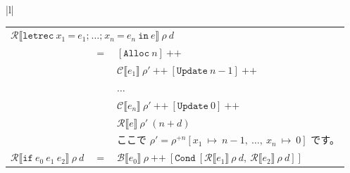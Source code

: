 \documentclass{jbook}
\begin{document}
\begin{tabular} {|l|}
\begin{tabular}{r c l}
		\multicolumn{3}{l}{$\mathcal{R} \llbracket \texttt{letrec} ~ x_1 ~ \texttt{=} ~ e_1\texttt{;} ~  \ldots \texttt{;} ~ x_n ~ \texttt{=} ~ e_n ~ \texttt{in} ~ e \rrbracket ~ \rho ~ d$}                                                                                                                        \\
		                                                                                      & $=$ & $\left[\texttt{Alloc} ~ n\right] ~ \texttt{++}$                                                                                                                                                                \\
		                                                                                      &     & $\mathcal{C} \llbracket e_1 \rrbracket ~ \rho' ~ \texttt{++} ~ \left[\texttt{Update} ~ n - 1\right] ~ \texttt{++}$                                                                                             \\
		                                                                                      &     & $\ldots$                                                                                                                                                                                                       \\
		                                                                                      &     & $\mathcal{C} \llbracket e_n \rrbracket ~ \rho' ~ \texttt{++} ~ \left[\texttt{Update} ~ 0\right] ~ \texttt{++}$                                                                                                 \\
		                                                                                      &     & $\mathcal{R} \llbracket e \rrbracket ~ \rho' ~ (n + d)$                                                                                                                                                        \\
		                                                                                      &     & ここで $\rho' = \rho^{+n} \left[x_1 ~ \mapsto ~ n - 1, ~ \ldots , ~ x_n ~ \mapsto ~ 0\right]$ です。                                                                                                           \\
		$\mathcal{R} \llbracket \texttt{if} ~ e_0 ~ e_1 ~ e_2 \rrbracket ~ \rho ~ d$          & $=$ & $\mathcal{B} \llbracket e_0 \rrbracket ~ \rho ~ \texttt{++} ~ \left[\texttt{Cond} ~ \left[\mathcal{R} \llbracket e_1 \rrbracket ~ \rho ~ d, ~ \mathcal{R} \llbracket e_2 \rrbracket ~ \rho ~ d\right] \right]$ \\

\end{tabular}
\end{tabular}
\end{document}
